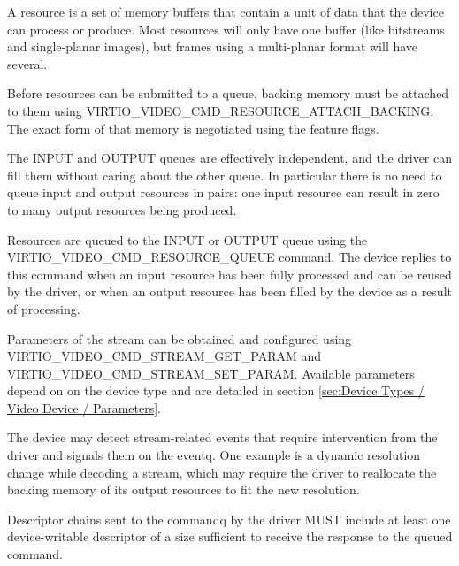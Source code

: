 A resource is a set of memory buffers that contain a unit of data that
the device can process or produce. Most resources will only have one
buffer (like bitstreams and single-planar images), but frames using a
multi-planar format will have several.

Before resources can be submitted to a queue, backing memory must be
attached to them using VIRTIO\_VIDEO\_CMD\_RESOURCE\_ATTACH\_BACKING.
The exact form of that memory is negotiated using the feature flags.

The INPUT and OUTPUT queues are effectively independent, and the driver
can fill them without caring about the other queue. In particular there
is no need to queue input and output resources in pairs: one input
resource can result in zero to many output resources being produced.

Resources are queued to the INPUT or OUTPUT queue using the
VIRTIO\_VIDEO\_CMD\_RESOURCE\_QUEUE command. The device replies to this
command when an input resource has been fully processed and can be
reused by the driver, or when an output resource has been filled by the
device as a result of processing.

Parameters of the stream can be obtained and configured using
VIRTIO\_VIDEO\_CMD\_STREAM\_GET\_PARAM and
VIRTIO\_VIDEO\_CMD\_STREAM\_SET\_PARAM. Available parameters depend on
on the device type and are detailed in section
\ref{sec:Device Types / Video Device / Parameters}.

The device may detect stream-related events that require intervention
from the driver and signals them on the eventq. One example is a dynamic
resolution change while decoding a stream, which may require the driver
to reallocate the backing memory of its output resources to fit the new
resolution.


Descriptor chains sent to the commandq by the driver MUST include at
least one device-writable descriptor of a size sufficient to receive the
response to the queued command.


